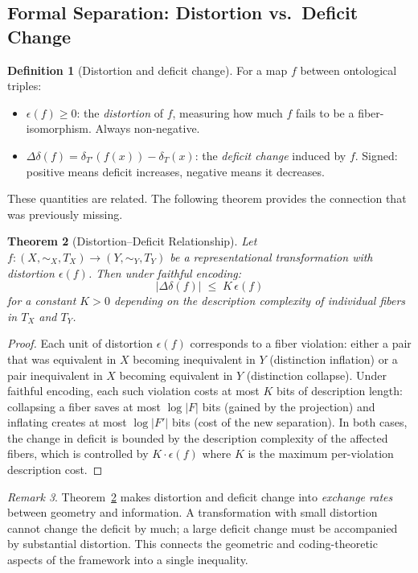\documentclass[12pt, a4paper]{article}
\theoremstyle{plain}
\newtheorem{theorem}{Theorem}[section]
\theoremstyle{definition}
\newtheorem{definition}[theorem]{Definition}
\theoremstyle{remark}
\newtheorem{remark}[theorem]{Remark}
\newcommand{\Ddelta}{\Delta\delta}
\newcommand{\eps}{\epsilon}
\begin{document}
\subsection{Formal Separation: Distortion vs.\ Deficit Change}
\label{subsec:formalism}

\begin{definition}[Distortion and deficit change]
For a map $f$ between ontological triples:
\begin{itemize}[leftmargin=1.8em]
  \item $\eps(f)\ge 0$: the \emph{distortion} of $f$, measuring how much $f$
        fails to be a fiber-isomorphism. Always non-negative.
  \item $\Ddelta(f)=\delta_{T'}(f(x))-\delta_T(x)$: the \emph{deficit change}
        induced by $f$. Signed: positive means deficit increases, negative
        means it decreases.
\end{itemize}
\end{definition}

These quantities are related. The following theorem provides the connection
that was previously missing.

\begin{theorem}[Distortion--Deficit Relationship]
\label{thm:dist-deficit}
Let $f:(X,\sim_X,T_X)\to(Y,\sim_Y,T_Y)$ be a representational transformation
with distortion $\eps(f)$. Then under faithful encoding:
\[
  |\Ddelta(f)| \;\le\; K\,\eps(f)
\]
for a constant $K>0$ depending on the description complexity of individual
fibers in $T_X$ and $T_Y$.
\end{theorem}

\begin{proof}
Each unit of distortion $\eps(f)$ corresponds to a fiber violation: either
a pair that was equivalent in $X$ becoming inequivalent in $Y$ (distinction
inflation) or a pair inequivalent in $X$ becoming equivalent in $Y$
(distinction collapse). Under faithful encoding, each such violation costs
at most $K$ bits of description length: collapsing a fiber saves at most
$\log|F|$ bits (gained by the projection) and inflating creates at most
$\log|F'|$ bits (cost of the new separation). In both cases, the change in
deficit is bounded by the description complexity of the affected fibers,
which is controlled by $K\cdot\eps(f)$ where $K$ is the maximum
per-violation description cost.
\end{proof}

\begin{remark}
Theorem~\ref{thm:dist-deficit} makes distortion and deficit change into
\emph{exchange rates} between geometry and information. A transformation
with small distortion cannot change the deficit by much; a large deficit
change must be accompanied by substantial distortion. This connects the
geometric and coding-theoretic aspects of the framework into a single
inequality.
\end{remark}
\end{document}
